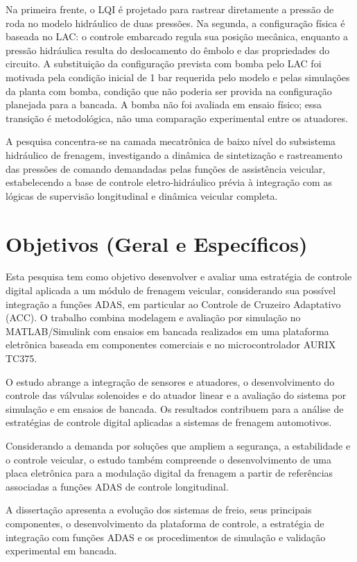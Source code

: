 Na primeira frente, o LQI é projetado para rastrear diretamente a pressão de roda no modelo hidráulico de duas pressões. Na segunda, a configuração física é baseada no LAC: o controle embarcado regula sua posição mecânica, enquanto a pressão hidráulica resulta do deslocamento do êmbolo e das propriedades do circuito. A substituição da configuração prevista com bomba pelo LAC foi motivada pela condição inicial de 1 bar requerida pelo modelo e pelas simulações da planta com bomba, condição que não poderia ser provida na configuração planejada para a bancada. A bomba não foi avaliada em ensaio físico; essa transição é metodológica, não uma comparação experimental entre os atuadores.

A pesquisa concentra-se na camada mecatrônica de baixo nível do subsistema hidráulico de frenagem, investigando a dinâmica de sintetização e rastreamento das pressões de comando demandadas pelas funções de assistência veicular, estabelecendo a base de controle eletro-hidráulico prévia à integração com as lógicas de supervisão longitudinal e dinâmica veicular completa.

\section{ Objetivos (Geral e Específicos) }
\label{sec:introducao-2}
Esta pesquisa tem como objetivo desenvolver e avaliar uma estratégia de controle digital aplicada a um módulo de frenagem veicular, considerando sua possível integração a funções ADAS, em particular ao Controle de Cruzeiro Adaptativo (ACC). O trabalho combina modelagem e avaliação por simulação no MATLAB/Simulink com ensaios em bancada realizados em uma plataforma eletrônica baseada em componentes comerciais e no microcontrolador AURIX TC375.

O estudo abrange a integração de sensores e atuadores, o desenvolvimento do controle das válvulas solenoides e do atuador linear e a avaliação do sistema por simulação e em ensaios de bancada. Os resultados contribuem para a análise de estratégias de controle digital aplicadas a sistemas de frenagem automotivos.

Considerando a demanda por soluções que ampliem a segurança, a estabilidade e o controle veicular, o estudo também compreende o desenvolvimento de uma placa eletrônica para a modulação digital da frenagem a partir de referências associadas a funções ADAS de controle longitudinal.

A dissertação apresenta a evolução dos sistemas de freio, seus principais componentes, o desenvolvimento da plataforma de controle, a estratégia de integração com funções ADAS e os procedimentos de simulação e validação experimental em bancada.

